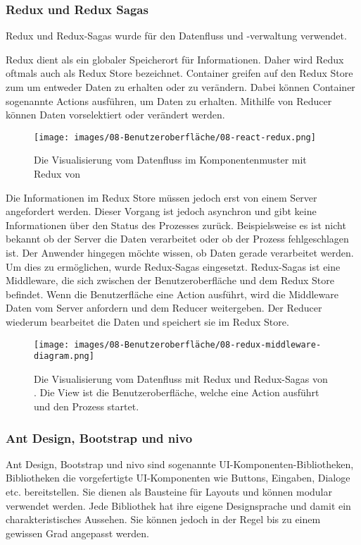 \subsubsection{Redux und Redux Sagas}
Redux und Redux-Sagas wurde für den Datenfluss und -verwaltung verwendet. 

Redux dient als ein globaler Speicherort für Informationen. Daher wird Redux oftmals auch als Redux Store bezeichnet. Container greifen auf den Redux Store zum um entweder Daten zu erhalten oder zu verändern. Dabei können Container sogenannte Actions ausführen, um Daten zu erhalten. Mithilfe von Reducer können Daten vorselektiert oder verändert werden. 

\begin{figure}[hbt!]%
  \centering
\texttt{[image: images/08-Benutzeroberfläche/08-react-redux.png]}
  \caption{Die Visualisierung vom Datenfluss im Komponentenmuster mit Redux von \cite{itnext18}}%
\end{figure}

Die Informationen im Redux Store müssen jedoch erst von einem Server angefordert werden. Dieser Vorgang ist jedoch asynchron und gibt keine Informationen über den Status des Prozesses zurück. Beispielsweise es ist nicht bekannt ob der Server die Daten verarbeitet oder ob der Prozess fehlgeschlagen ist. Der Anwender hingegen möchte wissen, ob Daten gerade verarbeitet werden. Um dies zu ermöglichen, wurde Redux-Sagas eingesetzt. Redux-Sagas ist eine Middleware, die sich zwischen der Benutzeroberfläche und dem Redux Store befindet. Wenn die Benutzerfläche eine Action ausführt, wird die Middleware Daten vom Server anfordern und dem Reducer weitergeben. Der Reducer wiederum bearbeitet die Daten und speichert sie im Redux Store. 

\begin{figure}[hbt!]%
  \centering
\texttt{[image: images/08-Benutzeroberfläche/08-redux-middleware-diagram.png]}
  \caption{Die Visualisierung vom Datenfluss mit Redux und Redux-Sagas von \cite{scalac19}. Die View ist die Benutzeroberfläche, welche eine Action ausführt und den Prozess startet.}%
\end{figure}



\subsubsection{Ant Design, Bootstrap und nivo}
Ant Design, Bootstrap und nivo sind sogenannte UI-Komponenten-Bibliotheken, Bibliotheken die vorgefertigte UI-Komponenten wie Buttons, Eingaben, Dialoge etc. bereitstellen. Sie dienen als Bausteine für Layouts und können modular verwendet werden. Jede Bibliothek hat ihre eigene Designsprache und damit ein charakteristisches Aussehen. Sie können jedoch in der Regel bis zu einem gewissen Grad angepasst werden.

